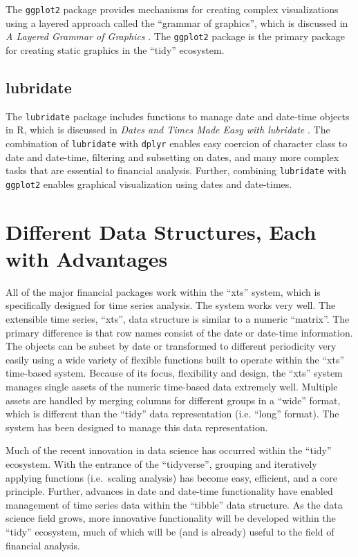 The \texttt{ggplot2} package provides mechanisms for creating complex
visualizations using a layered approach called the ``grammar of
graphics'', which is discussed in \emph{A Layered Grammar of Graphics}
\citep{layered-grammar}. The \texttt{ggplot2} package is the primary
package for creating static graphics in the ``tidy'' ecosystem.

\subsection{lubridate}\label{lubridate}

The \texttt{lubridate} package includes functions to manage date and
date-time objects in R, which is discussed in \emph{Dates and Times Made
Easy with lubridate} \citep{lubridate}. The combination of
\texttt{lubridate} with \texttt{dplyr} enables easy coercion of
character class to date and date-time, filtering and subsetting on
dates, and many more complex tasks that are essential to financial
analysis. Further, combining \texttt{lubridate} with \texttt{ggplot2}
enables graphical visualization using dates and date-times.

\section{Different Data Structures, Each with
Advantages}\label{different-data-structures-each-with-advantages}

All of the major financial packages work within the ``xts'' system,
which is specifically designed for time series analysis. The system
works very well. The extensible time series, ``xts'', data structure is
similar to a numeric ``matrix''. The primary difference is that row
names consist of the date or date-time information. The objects can be
subset by date or transformed to different periodicity very easily using
a wide variety of flexible functions built to operate within the ``xts''
time-based system. Because of its focus, flexibility and design, the
``xts'' system manages single assets of the numeric time-based data
extremely well. Multiple assets are handled by merging columns for
different groups in a ``wide'' format, which is different than the
``tidy'' data representation (i.e. ``long'' format). The system has been
designed to manage this data representation.

Much of the recent innovation in data science has occurred within the
``tidy'' ecosystem. With the entrance of the ``tidyverse'', grouping and
iteratively applying functions (i.e.~scaling analysis) has become easy,
efficient, and a core principle. Further, advances in date and date-time
functionality have enabled management of time series data within the
``tibble'' data structure. As the data science field grows, more
innovative functionality will be developed within the ``tidy''
ecosystem, much of which will be (and is already) useful to the field of
financial analysis.

